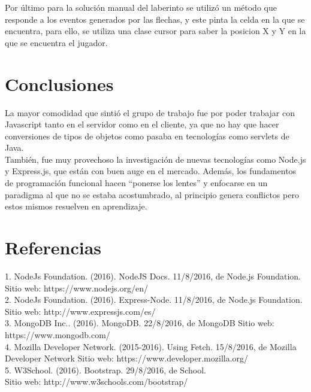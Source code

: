 \documentclass[11pt]{article}
\begin{document}
Por último para la solución manual del laberinto se utilizó un método que responde a los eventos generados por las flechas, y este pinta la celda en la que se encuentra, para ello, se utiliza una clase cursor para saber la posicion X y Y en la que se encuentra el jugador.


\section{Conclusiones}
La mayor comodidad que sintió el grupo de trabajo fue por poder trabajar con Javascript tanto en el servidor como en el cliente, ya que no hay que hacer conversiones de tipos de objetos como pasaba en tecnologías como servlets de Java. \\
	También, fue muy provechoso la investigación de nuevas tecnologías como Node.js y Express.js, que están con buen auge en el mercado. Además, los fundamentos de programación funcional hacen “ponerse los lentes” y enfocarse en un paradigma al que no se estaba acostumbrado, al principio genera conflictos pero estos mismos resuelven en aprendizaje.\\


\section{Referencias}

1. NodeJs Foundation. (2016). NodeJS Docs. 11/8/2016, de Node.js Foundation. Sitio web: https://www.nodejs.org/en/ \\
2. NodeJs Foundation. (2016). Express-Node. 11/8/2016, de Node.js Foundation. Sitio web: http://www.expressjs.com/es/\\
3. MongoDB Inc.. (2016). MongoDB. 22/8/2016, de MongoDB Sitio web: https://www.mongodb.com/\\
4. Mozilla Developer Network. (2015-2016). Using Fetch. 15/8/2016, de Mozilla Developer Network Sitio web: https://www.developer.mozilla.org/\\
5. W3School. (2016). Bootstrap. 29/8/2016, de School. \\ Sitio web: http://www.w3schools.com/bootstrap/\\
\end{document}
